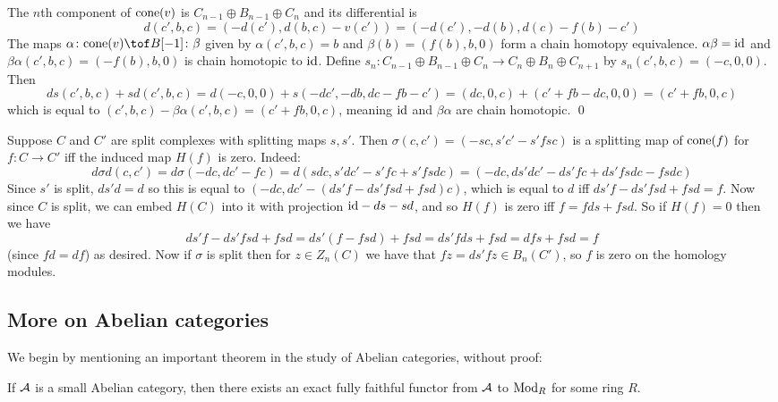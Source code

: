 \eprop

\bproof

    The $n$th component of ${\rm cone}(v)$ is $C_{n-1}\oplus B_{n-1}\oplus C_n$ and its differential is
    $$ d(c',b,c) = (-d(c'),d(b,c)-v(c')) = (-d(c'), -d(b), d(c) - f(b) - c') $$
    The maps $\alpha\colon\cone(v)\tof B[-1]\colon\beta$ given by $\alpha(c',b,c)=b$ and $\beta(b)=(f(b),b,0)$ form a chain homotopy equivalence.
    $\alpha\beta={\rm id}$ and $\beta\alpha(c',b,c)=(-f(b),b,0)$ is chain homotopic to ${\rm id}$.
    Define $s_n\colon C_{n-1}\oplus B_{n-1}\oplus C_n\to C_n\oplus B_n\oplus C_{n+1}$ by $s_n(c',b,c)=(-c,0,0)$.
    Then
    $$ ds(c',b,c) + sd(c',b,c) = d(-c,0,0) + s(-dc',-db,dc-fb-c') = (dc,0,c) + (c'+fb-dc,0,0) = (c'+fb,0,c) $$
    which is equal to $(c',b,c)-\beta\alpha(c',b,c)=(c'+fb,0,c)$, meaning ${\rm id}$ and $\beta\alpha$ are chain homotopic.
    \qed

\eproof

\bexam

    Suppose $C$ and $C'$ are split complexes with splitting maps $s,s'$.
    Then $\sigma(c,c')=(-sc,s'c'-s'fsc)$ is a splitting map of ${\rm cone}(f)$ for $f\colon C\to C'$ iff the induced map $H(f)$ is zero.
    Indeed:
    $$ d\sigma d(c,c') = d\sigma(-dc,dc'-fc) = d(sdc, s'dc'-s'fc+s'fsdc) = (-dc, ds'dc' - ds'fc + ds'fsdc - fsdc) $$
    Since $s'$ is split, $ds'd=d$ so this is equal to $(-dc,dc'-(ds'f-ds'fsd+fsd)c)$, which is equal to $d$ iff $ds'f-ds'fsd+fsd=f$.
    Now since $C$ is split, we can embed $H(C)$ into it with projection ${\rm id}-ds-sd$, and so $H(f)$ is zero iff $f=fds+fsd$.
    So if $H(f)=0$ then we have
    $$ ds'f - ds'fsd + fsd = ds'(f-fsd) + fsd = ds'fds + fsd = dfs + fsd = f $$
    (since $fd=df$) as desired.
    Now if $\sigma$ is split then for $z\in Z_n(C)$ we have that $fz=ds'fz\in B_n(C')$, so $f$ is zero on the homology modules.

\eexam

\subsection{More on Abelian categories}

We begin by mentioning an important theorem in the study of Abelian categories, without proof:

\bthrm[title=Freyd-Mitchell]

    If ${{\cal A}}$ is a small Abelian category, then there exists an exact fully faithful functor from ${{\cal A}}$ to ${\rm Mod}_R$ for some ring $R$.

\ethrm

